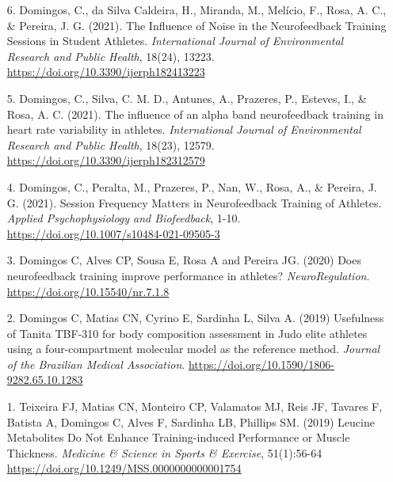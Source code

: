 \begin{enumerate}
  \item[6.] Domingos, C., da Silva Caldeira, H., Miranda, M., Melício, F., Rosa, A. C., \& Pereira, J. G. (2021). The Influence of Noise in the Neurofeedback Training Sessions in Student Athletes. \emph{International Journal of Environmental Research and Public Health}, 18(24), 13223. \url{https://doi.org/10.3390/ijerph182413223}

  \item[5.] Domingos, C., Silva, C. M. D., Antunes, A., Prazeres, P., Esteves, I., \& Rosa, A. C. (2021). The influence of an alpha band neurofeedback training in heart rate variability in athletes. \emph{International Journal of Environmental Research and Public Health}, 18(23), 12579. \url{https://doi.org/10.3390/ijerph182312579}

  \item[4.] Domingos, C., Peralta, M., Prazeres, P., Nan, W., Rosa, A., \& Pereira, J. G. (2021). Session Frequency Matters in Neurofeedback Training of Athletes. \emph{Applied Psychophysiology and Biofeedback}, 1-10. \url{https://doi.org/10.1007/s10484-021-09505-3}

  \item[3.] Domingos C, Alves CP, Sousa E, Rosa A and Pereira JG. (2020) Does neurofeedback training improve performance in athletes? \emph{NeuroRegulation}. \url{https://doi.org/10.15540/nr.7.1.8}

  \item[2.] Domingos C, Matias CN, Cyrino E, Sardinha L, Silva A. (2019) Usefulness of Tanita TBF-310 for body composition assessment in Judo elite athletes using a four-compartment molecular model as the reference method. \emph{Journal of the Brazilian Medical Association}. \url{https://doi.org/10.1590/1806-9282.65.10.1283}

  \item[1.] Teixeira FJ, Matias CN, Monteiro CP, Valamatos MJ, Reis JF, Tavares F, Batista A, Domingos C, Alves F, Sardinha LB, Phillips SM. (2019) Leucine Metabolites Do Not Enhance Training-induced Performance or Muscle Thickness. \emph{Medicine \& Science in Sports \& Exercise}, 51(1):56-64 \url{https://doi.org/10.1249/MSS.0000000000001754}
  
\end{enumerate}